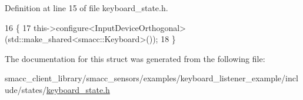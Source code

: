 Definition at line 15 of file keyboard\+\_\+state.\+h.


\begin{DoxyCode}
16   \{
17     this->configure<InputDeviceOrthogonal>(std::make\_shared<smacc::Keyboard>());
18   \}
\end{DoxyCode}


The documentation for this struct was generated from the following file\+:\begin{DoxyCompactItemize}
\item 
smacc\+\_\+client\+\_\+library/smacc\+\_\+sensors/examples/keyboard\+\_\+listener\+\_\+example/include/states/\hyperlink{keyboard__state_8h}{keyboard\+\_\+state.\+h}\end{DoxyCompactItemize}
